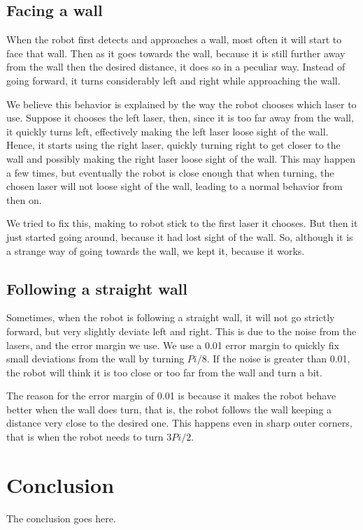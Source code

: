 \documentclass[10pt,journal,compsoc]{IEEEtran}
\begin{document}
\subsection{Facing a wall}

When the robot first detects and approaches a wall, most often it will start to face that wall. Then as it goes towards the wall, because it is still further away from the wall then the desired distance, it does so in a peculiar way. Instead of going forward, it turns considerably left and right while approaching the wall.

We believe this behavior is explained by the way the robot chooses which laser to use. Suppose it chooses the left laser, then, since it is too far away from the wall, it quickly turns left, effectively making the left laser loose sight of the wall. Hence, it starts using the right laser, quickly turning right to get closer to the wall and possibly making the right laser loose sight of the wall. This may happen a few times, but eventually the robot is close enough that when turning, the chosen laser will not loose sight of the wall, leading to a normal behavior from then on.

We tried to fix this, making to robot stick to the first laser it chooses. But then it just started going around, because it had lost sight of the wall. So, although it is a strange way of going towards the wall, we kept it, because it works.

\subsection{Following a straight wall}

Sometimes, when the robot is following a straight wall, it will not go strictly forward, but very slightly deviate left and right. This is due to the noise from the lasers, and the error margin we use. We use a 0.01 error margin to quickly fix small deviations from the wall by turning $Pi/8$. If the noise is greater than 0.01, the robot will think it is too close or too far from the wall and turn a bit.

The reason for the error margin of 0.01 is because it makes the robot behave better when the wall does turn, that is, the robot follows the wall keeping a distance very close to the desired one. This happens even in sharp outer corners, that is when the robot needs to turn $3Pi/2$.


\section{Conclusion}
The conclusion goes here.

\ifCLASSOPTIONcaptionsoff
  \newpage
\fi



\end{document}
